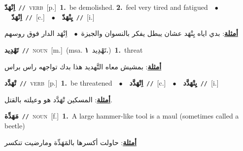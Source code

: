 \documentclass[10pt,a4paper,twoside]{article} %
\begin{document}
\begin{multicols}{2}
{\setlength\topsep{0pt}\textbf{\foreignlanguage{arabic}{اِنْهَدّ}}\ {\color{gray}\texttt{//}\color{black}}\ \textsc{verb}\ [p.]\ \textbf{1.}~be demolished.  \textbf{2.}~feel very tired and fatigued\ \ $\bullet$\ \ \setlength\topsep{0pt}\textbf{\foreignlanguage{arabic}{اِنْهَدّ}}\ {\color{gray}\texttt{//}\color{black}}\ [c.]\ \ $\bullet$\ \ \setlength\topsep{0pt}\textbf{\foreignlanguage{arabic}{يِنْهَدّ}}\ {\color{gray}\texttt{//}\color{black}}\ [i.]\  \begin{flushright}\color{gray}\foreignlanguage{arabic}{\textbf{\underline{\foreignlanguage{arabic}{أمثلة}}}: بدي اياه يِنْهَد عشان يبطل يفكر بالنسوان والجيزة\ $\bullet$\ \  اِنْهَد الدار فوق روسهم}\end{flushright}\color{black}} \vspace{2mm}

{\setlength\topsep{0pt}\textbf{\foreignlanguage{arabic}{تَهْدِيد}}\ {\color{gray}\texttt{//}\color{black}}\ \textsc{noun}\ [m.]\ \color{gray}(msa. \foreignlanguage{arabic}{تَهْدِيد}~\foreignlanguage{arabic}{\textbf{١.}})\color{black}\ \textbf{1.}~threat\  \begin{flushright}\color{gray}\foreignlanguage{arabic}{\textbf{\underline{\foreignlanguage{arabic}{أمثلة}}}: بمشيش معاه التَّهديد هذا بدك تواجهه راس براس}\end{flushright}\color{black}} \vspace{2mm}

{\setlength\topsep{0pt}\textbf{\foreignlanguage{arabic}{تْهَدَّد}}\ {\color{gray}\texttt{//}\color{black}}\ \textsc{verb}\ [p.]\ \textbf{1.}~be threatened\ \ $\bullet$\ \ \setlength\topsep{0pt}\textbf{\foreignlanguage{arabic}{اِتْهَدَّد}}\ {\color{gray}\texttt{//}\color{black}}\ [c.]\ \ $\bullet$\ \ \setlength\topsep{0pt}\textbf{\foreignlanguage{arabic}{يِتْهَدَّد}}\ {\color{gray}\texttt{//}\color{black}}\ [i.]\  \begin{flushright}\color{gray}\foreignlanguage{arabic}{\textbf{\underline{\foreignlanguage{arabic}{أمثلة}}}: المسكين تْهَدَّد هو وعيلته بالقتل.}\end{flushright}\color{black}} \vspace{2mm}

{\setlength\topsep{0pt}\textbf{\foreignlanguage{arabic}{مَهَدِّة}}\ {\color{gray}\texttt{//}\color{black}}\ \textsc{noun}\ [f.]\ \textbf{1.}~A large hammer-like tool is a maul (sometimes called a beetle)\  \begin{flushright}\color{gray}\foreignlanguage{arabic}{\textbf{\underline{\foreignlanguage{arabic}{أمثلة}}}: حاولت أكسرها بالمَهَدِّة ومارضيت تنكسر}\end{flushright}\color{black}} \vspace{2mm}


\end{multicols}
\end{document}
